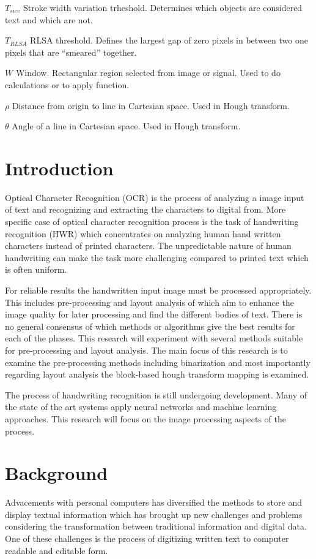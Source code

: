 \documentclass{article}
\begin{document}
\begin{abbrv}
    \item[$T_{swv}$] Stroke width variation trheshold. Determines which objects are considered text and which are not.
    \item[$T_{RLSA}$] RLSA threshold. Defines the largest gap of zero pixels in between two one pixels that are ``smeared'' together.
    \item[$W$] Window. Rectangular region selected from image or signal. Used to do calculations or to apply function.
    \item[$\rho$] Distance from origin to line in Cartesian space. Used in Hough transform.
    \item[$\theta$] Angle of a line in Cartesian space. Used in Hough transform.
   \end{abbrv}

   \newpage
   \section{Introduction}
    Optical Character Recognition (OCR) is the process of analyzing a image input of  text and recognizing and extracting the characters to digital from. More specific case of optical character recognition process is the task of handwriting recognition (HWR) which concentrates on analyzing human hand written characters instead of printed characters. The unpredictable nature of human handwriting can make the task more challenging compared to printed text which is often uniform.

    For reliable results the handwritten input image must be processed appropriately. This includes pre-processing and layout analysis of which aim to enhance the image quality for later processing and find the different bodies of text. There is no general consensus of which methods or algorithms give the best results for each of the phases. This research will experiment with several methods suitable for pre-processing and layout analysis. The main focus of this research is to examine the pre-processing methods including binarization and most importantly regarding layout analysis the block-based hough transform mapping is examined.

    The process of handwriting recognition is still undergoing development. Many of the state of the art systems apply neural networks and machine learning approaches. This research will focus on the image processing aspects of the process.

  \newpage
  \section{Background}
    Advacements with personal computers has diversified the methods to store and display textual information which has brought up new challenges and problems considering the transformation between traditional information and digital data. One of these challenges is the process of digitizing written text to computer readable and editable form.
\end{document}
